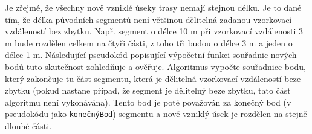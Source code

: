 
Je zřejmé, že všechny nově vzniklé úseky trasy nemají stejnou délku. Je to dané tím, že délka původních segmentů není většinou dělitelná zadanou vzorkovací vzdáleností bez zbytku. Např. segment o délce 10 m při vzorkovací vzdálenosti 3 m bude rozdělen celkem na čtyři části, z toho tři budou o délce 3 m a jeden o délce 1 m. Následující pseudokód popisující výpočetní funkci souřadnic nových bodů tuto skutečnost zohledňuje a ověřuje. Algoritmus vypočte souřadnice bodu, který zakončuje tu část segmentu, která je dělitelná vzorkovací vzdáleností beze zbytku (pokud nastane případ, že segment je dělitelný beze zbytku, tato část algoritmu není vykonávána). Tento bod je poté považován za konečný bod (v pseudokódu jako \texttt{konečnýBod}) segmentu a nově vzniklý úsek je rozdělen na stejně dlouhé části. 


